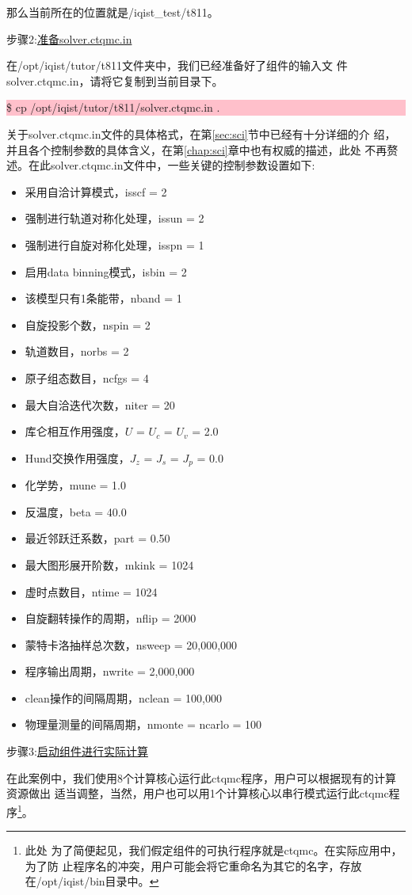 那么当前所在的位置就是/iqist\_test/t811。

步骤2:\underline{准备solver.ctqmc.in}

在/opt/iqist/tutor/t811文件夹中，我们已经准备好了{\azalea}组件的输入文
件solver.ctqmc.in，请将它复制到当前目录下。

\noindent\colorbox{pink}{\parbox[r]{\linewidth}{\quad \$ cp /opt/iqist/tutor/t811/solver.ctqmc.in . }}

关于solver.ctqmc.in文件的具体格式，在第\ref{sec:sci}节中已经有十分详细的介
绍，并且各个控制参数的具体含义，在第\ref{chap:sci}章中也有权威的描述，此处
不再赘述。在此solver.ctqmc.in文件中，一些关键的控制参数设置如下:
\begin{itemize}
  \item 采用自洽计算模式，isscf = 2
  \item 强制进行轨道对称化处理，issun = 2
  \item 强制进行自旋对称化处理，isspn = 1
  \item 启用data binning模式，isbin = 2
  \item 该模型只有1条能带，nband = 1
  \item 自旋投影个数，nspin = 2
  \item 轨道数目，norbs = 2
  \item 原子组态数目，ncfgs = 4
  \item 最大自洽迭代次数，niter = 20
  \item 库仑相互作用强度，$U$ = $U_{c}$ = $U_{v}$ = 2.0 
  \item Hund交换作用强度，$J_{z}$ = $J_{s}$ = $J_{p}$ = 0.0
  \item 化学势，mune = 1.0
  \item 反温度，beta = 40.0
  \item 最近邻跃迁系数，part = 0.50
  \item 最大图形展开阶数，mkink = 1024
  \item 虚时点数目，ntime = 1024
  \item 自旋翻转操作的周期，nflip = 2000
  \item 蒙特卡洛抽样总次数，nsweep = 20,000,000
  \item 程序输出周期，nwrite = 2,000,000
  \item clean操作的间隔周期，nclean = 100,000
  \item 物理量测量的间隔周期，nmonte = ncarlo = 100 
\end{itemize}

步骤3:\underline{启动{\azalea}组件进行实际计算}

在此案例中，我们使用8个计算核心运行此ctqmc程序，用户可以根据现有的计算资源做出
适当调整，当然，用户也可以用1个计算核心以串行模式运行此ctqmc程序\footnote{此处
为了简便起见，我们假定{\azalea}组件的可执行程序就是ctqmc。在实际应用中，为了防
止程序名的冲突，用户可能会将它重命名为其它的名字，存放在/opt/iqist/bin目录中。}。

